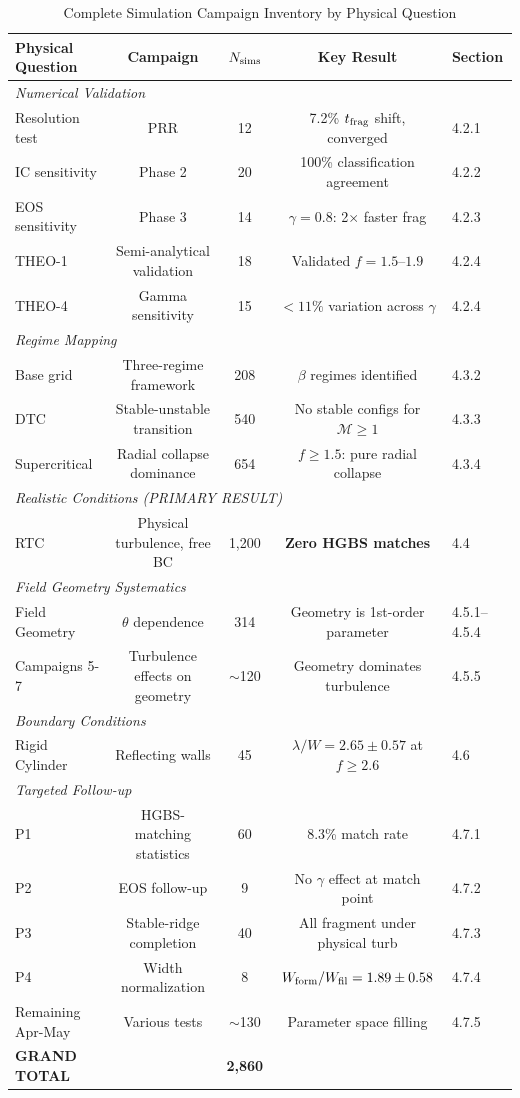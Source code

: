 \documentclass[twocolumn]{mnras}
\begin{document}
\begin{table}
\caption{Complete Simulation Campaign Inventory by Physical Question}
\label{tab:campaign_master}
\small
\begin{tabular}{lcccl}
\toprule
\textbf{Physical Question} & \textbf{Campaign} & $N_{\rm sims}$ & \textbf{Key Result} & \textbf{Section} \\
\midrule
\multicolumn{5}{l}{\textit{Numerical Validation}} \\
Resolution test & PRR & 12 & 7.2\% $t_{\rm frag}$ shift, converged & 4.2.1 \\
IC sensitivity & Phase 2 & 20 & 100\% classification agreement & 4.2.2 \\
EOS sensitivity & Phase 3 & 14 & $\gamma=0.8$: 2$\times$ faster frag & 4.2.3 \\
THEO-1 & Semi-analytical validation & 18 & Validated $f=1.5$--$1.9$ & 4.2.4 \\
THEO-4 & Gamma sensitivity & 15 & $<11\%$ variation across $\gamma$ & 4.2.4 \\
\midrule
\multicolumn{5}{l}{\textit{Regime Mapping}} \\
Base grid & Three-regime framework & 208 & $\beta$ regimes identified & 4.3.2 \\
DTC & Stable-unstable transition & 540 & No stable configs for $\mathcal{M}\geq1$ & 4.3.3 \\
Supercritical & Radial collapse dominance & 654 & $f\geq1.5$: pure radial collapse & 4.3.4 \\
\midrule
\multicolumn{5}{l}{\textit{Realistic Conditions (PRIMARY RESULT)}} \\
RTC & Physical turbulence, free BC & 1,200 & \textbf{Zero HGBS matches} & 4.4 \\
\midrule
\multicolumn{5}{l}{\textit{Field Geometry Systematics}} \\
Field Geometry & $\theta$ dependence & 314 & Geometry is 1st-order parameter & 4.5.1--4.5.4 \\
Campaigns 5-7 & Turbulence effects on geometry & $\sim$120 & Geometry dominates turbulence & 4.5.5 \\
\midrule
\multicolumn{5}{l}{\textit{Boundary Conditions}} \\
Rigid Cylinder & Reflecting walls & 45 & $\lambda/W=2.65\pm0.57$ at $f\geq2.6$ & 4.6 \\
\midrule
\multicolumn{5}{l}{\textit{Targeted Follow-up}} \\
P1 & HGBS-matching statistics & 60 & 8.3\% match rate & 4.7.1 \\
P2 & EOS follow-up & 9 & No $\gamma$ effect at match point & 4.7.2 \\
P3 & Stable-ridge completion & 40 & All fragment under physical turb & 4.7.3 \\
P4 & Width normalization & 8 & $W_{\rm form}/W_{\rm fil}=1.89\pm0.58$ & 4.7.4 \\
Remaining Apr-May & Various tests & $\sim$130 & Parameter space filling & 4.7.5 \\
\midrule
\textbf{GRAND TOTAL} & & \textbf{2,860} &  \\
\bottomrule
\end{tabular}
\end{table}
\end{document}
